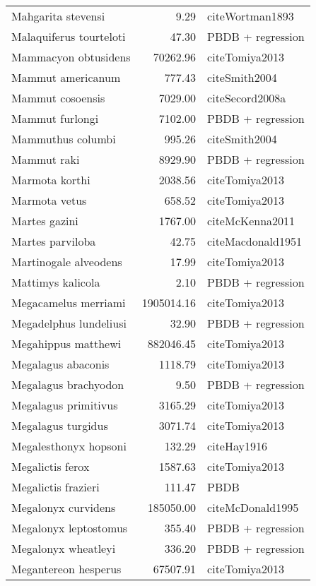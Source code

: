 \begin{table}[ht]
\begin{tabular}{lrl}
  Mahgarita stevensi & 9.29 & cite{Wortman1893} \\ 
  Malaquiferus tourteloti & 47.30 & PBDB + regression \\ 
  Mammacyon obtusidens & 70262.96 & cite{Tomiya2013} \\ 
  Mammut americanum & 777.43 & cite{Smith2004} \\ 
  Mammut cosoensis & 7029.00 & cite{Secord2008a} \\ 
  Mammut furlongi & 7102.00 & PBDB + regression \\ 
  Mammuthus columbi & 995.26 & cite{Smith2004} \\ 
  Mammut raki & 8929.90 & PBDB + regression \\ 
  Marmota korthi & 2038.56 & cite{Tomiya2013} \\ 
  Marmota vetus & 658.52 & cite{Tomiya2013} \\ 
  Martes gazini & 1767.00 & cite{McKenna2011} \\ 
  Martes parviloba & 42.75 & cite{Macdonald1951} \\ 
  Martinogale alveodens & 17.99 & cite{Tomiya2013} \\ 
  Mattimys kalicola & 2.10 & PBDB + regression \\ 
  Megacamelus merriami & 1905014.16 & cite{Tomiya2013} \\ 
  Megadelphus lundeliusi & 32.90 & PBDB + regression \\ 
  Megahippus matthewi & 882046.45 & cite{Tomiya2013} \\ 
  Megalagus abaconis & 1118.79 & cite{Tomiya2013} \\ 
  Megalagus brachyodon & 9.50 & PBDB + regression \\ 
  Megalagus primitivus & 3165.29 & cite{Tomiya2013} \\ 
  Megalagus turgidus & 3071.74 & cite{Tomiya2013} \\ 
  Megalesthonyx hopsoni & 132.29 & cite{Hay1916} \\ 
  Megalictis ferox & 1587.63 & cite{Tomiya2013} \\ 
  Megalictis frazieri & 111.47 & PBDB \\ 
  Megalonyx curvidens & 185050.00 & cite{McDonald1995} \\ 
  Megalonyx leptostomus & 355.40 & PBDB + regression \\ 
  Megalonyx wheatleyi & 336.20 & PBDB + regression \\ 
  Megantereon hesperus & 67507.91 & cite{Tomiya2013} \\ 

\end{tabular}
\end{table}
